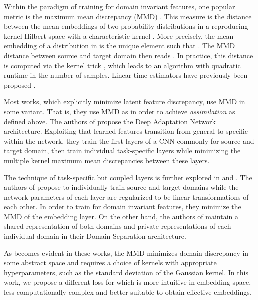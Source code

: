 \documentclass[10pt,twocolumn,letterpaper]{article}
\begin{document}
Within the paradigm of training for domain invariant features, one popular metric is the maximum mean discrepancy (MMD) \cite{Gretton2012}.
This measure is the distance between the mean embeddings of two probability distributions in a reproducing kernel Hilbert space  with a characteristic kernel .
More precisely, the mean embedding of a distribution  in  is the unique element  such that .
The MMD distance between source and target domain then reads .
In practice, this distance is computed via the kernel trick \cite{Vapnik1995}, which leads to an algorithm with quadratic runtime in the number of samples.
Linear time estimators have previously been proposed \cite{Long2015a}.

Most works, which explicitly minimize latent feature discrepancy, use MMD in some variant. That is, they use MMD as  in order to achieve \emph{assimilation} as defined above.
The authors of \cite{Long2015a} propose the Deep Adaptation Network architecture.
Exploiting that learned features transition from general to specific within the network, they train the first layers of a CNN commonly for source and target domain, then train individual task-specific layers while minimizing the multiple kernel maximum mean discrepancies between these layers. 

The technique of task-specific but coupled layers is further explored in \cite{Rozantsev2016} and \cite{Bousmalis2016}.
The authors of \cite{Rozantsev2016} propose to individually train source and target domains while the network parameters of each layer are regularized to be linear transformations of each other.
In order to train for domain invariant features, they minimize the MMD of the embedding layer.
On the other hand, the authors of \cite{Bousmalis2016} maintain a shared representation of both domains and private representations of each individual domain in their Domain Separation architecture.

As becomes evident in these works, the MMD minimizes domain discrepancy in some abstract space and requires a choice of kernels with appropriate hyperparameters, such as the standard deviation of the Gaussian kernel. In this work, we propose a different loss for  which is more intuitive in embedding space, less computationally complex and better suitable to obtain effective embeddings.
\end{document}
